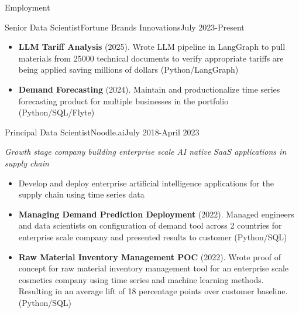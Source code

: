 \documentclass[]{mcdowellcv}
\begin{document}
	\makeheader

	
	\begin{cvsection}{Employment}
	
		\begin{cvsubsection}{Senior Data Scientist}{Fortune Brands Innovations}{July 2023-Present}	
		         \vspace{1mm}		
			\begin{itemize}
                           \vspace{-1mm}		
				\item \textbf{LLM Tariff Analysis} (2025). Wrote LLM pipeline in LangGraph to pull materials from 25000 technical documents to verify appropriate tariffs are being applied saving millions of dollars (Python/LangGraph)
				\item \textbf{Demand Forecasting} (2024). Maintain and productionalize time series forecasting product for multiple businesses in the portfolio (Python/SQL/Flyte)

			\end{itemize}
		\end{cvsubsection}
	
		\begin{cvsubsection}{Principal Data Scientist}{Noodle.ai}{July 2018-April 2023}	
		         \vspace{1mm}		
			\centerline{\it Growth stage company building enterprise scale AI native SaaS applications in supply chain}
			\begin{itemize}
                           \vspace{-1mm}		
				\item Develop and deploy enterprise artificial intelligence applications for the supply chain using time series data
				\item \textbf{Managing Demand Prediction Deployment} (2022). Managed engineers and data scientists on configuration of demand tool across 2 countries for enterprise scale company and presented results to customer (Python/SQL)
				\item \textbf{Raw Material Inventory Management POC} (2022). Wrote proof of concept for raw material inventory management tool for an enterprise scale cosmetics company using time series and machine learning methods. Resulting in an average lift of 18 percentage points over customer baseline. (Python/SQL)
			\end{itemize}
		\end{cvsubsection}


\end{cvsection}
\end{document}
